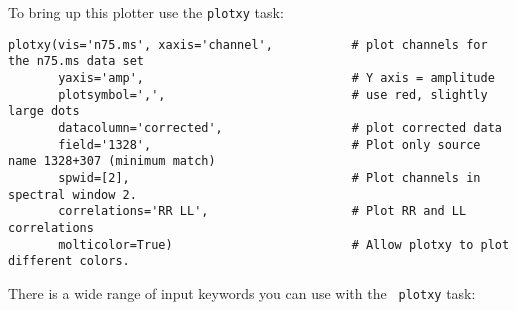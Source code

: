 To bring up this plotter use the {\tt plotxy} task: 
\small
\begin{verbatim}
plotxy(vis='n75.ms', xaxis='channel',           # plot channels for the n75.ms data set
       yaxis='amp',                             # Y axis = amplitude
       plotsymbol=',',                          # use red, slightly large dots
       datacolumn='corrected',                  # plot corrected data
       field='1328',                            # Plot only source name 1328+307 (minimum match)
       spwid=[2],                               # Plot channels in spectral window 2. 
       correlations='RR LL',                    # Plot RR and LL correlations
       molticolor=True)                         # Allow plotxy to plot different colors. 
\end{verbatim}
\normalsize

There is a wide range of input keywords you can use with the {\tt
plotxy} task: 

